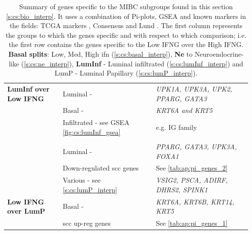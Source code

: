 \begin{table}[!htb]
\begin{tabularx}{\textwidth}{>{\hsize=0.8\hsize}X|>{\hsize=1.1\hsize}X|>{\hsize=1.1\hsize}X}
    \midrule
    \multicolumn{3}{c}{\textbf{LumInf - \cref{fig:cs:lumInf_pi}}} \\
    \midrule  
    \textbf{LumInf over Low IFNG} & Luminal - \citep{Robertson2017-mg} & \textit{UPK1A, UPK3A, UPK2, PPARG, GATA3} \\
    \midrule
    \multirow{2}{=}{\parbox[t]{\hsize}{\textbf{Low IFNG over LumInf}}} & Basal - \citep{Robertson2017-mg} & \textit{KRT6A and KRT5} \\
    \cmidrule{2-3}
    & Infiltrated - see GSEA \cref{fig:cs:lumInf_gsea} & e.g. IG family \\
    \midrule
    \multicolumn{3}{c}{\textbf{LumP - \cref{fig:cs:lumP_pi}}} \\
    \midrule  
    \multirow{3}{*}{\textbf{LumP}} & Luminal - \cite{Robertson2017-mg} & \textit{PPARG, GATA3, UPK3A, FOXA1} \\
    \cmidrule{2-3}
    & Down-regulated \acrshort{scc} genes \cite{Hurst2022-sp} & See \cref{tab:ap:pi_genes_2} \\
    \cmidrule{2-3}
    & Various - see \cref{s:cs:lumP_interp} & \textit{VSIG2, PSCA, ADIRF, DHRS2, SPINK1} \\
    \midrule
    \textbf{Low IFNG over LumP} & Basal - \cite{Robertson2017-mg} & \textit{KRT6A, KRT6B, KRT14, KRT5} \\
    \midrule
    & \acrshort{scc} up-reg genes \citet{Hurst2022-sp} & See \cref{tab:ap:pi_genes_1}\\
    \bottomrule
  \end{tabularx}
  \caption[Summary of the genes found across the DEAs]{Summary of genes specific to the MIBC subgroups found in this section \cref{s:cs:bio_interp}. It uses a combination of Pi-plots, GSEA and known markers in the fields: TCGA markers \citet{Robertson2017-mg}, Consensus \citet{Kamoun2020-tj} and Lund \citet{Marzouka2018-ge}. The first column represents the groups to which the genes specific and with respect to which comparison; i.e. the first row contains the genes specific to the Low IFNG over the High IFNG. \textbf{Basal splits}: Low, Med, High \acrshort{ifn} (\cref{s:cs:basal_interp}), \textbf{Ne} to Neuroendocrine-like (\cref{s:cs:ne_interp}), \textbf{LumInf} - Luminal infiltrated (\cref{s:cs:lumInf_interp}) and LumP - Luminal Papillary (\cref{s:cs:lumP_interp}).   }
  \label{tab:cs:genes_summaries}
\end{table}


